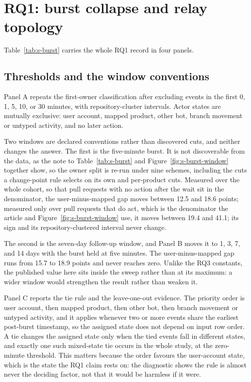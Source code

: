 \documentclass[pdflatex,sn-basic]{sn-jnl}
\begin{document}


\section{RQ1: burst collapse and relay topology}\label{app:rq1}

Table~\ref{tab:s-burst} carries the whole RQ1 record in four panels.

\subsection{Thresholds and the window conventions}\label{app:ordering}

Panel A repeats the first-owner classification after excluding events in the
first 0, 1, 5, 10, or 30 minutes, with repository-cluster intervals. Actor
states are mutually exclusive: user account, mapped product, other bot, branch
movement or untyped activity, and no later action.

Two windows are declared conventions rather than discovered cuts, and neither
changes the answer. The first is the five-minute burst. It is not discoverable
from the data, as the note to Table~\ref{tab:s-burst} and
Figure~\ref{fig:s-burst-window} together show, so the owner split is re-run
under nine schemes, including the cuts a change-point rule selects on its own
and per-product cuts. Measured over the whole cohort, so that pull requests with
no action after the wait sit in the denominator, the user-minus-mapped gap moves
between 12.5 and 18.6 points; measured only over pull requests that do act,
which is the denominator the article and Figure~\ref{fig:s-burst-window} use, it
moves between 19.4 and 41.1; its sign and its repository-clustered interval
never change.

The second is the seven-day follow-up window, and Panel B moves it to 1, 3, 7,
and 14 days with the burst held at five minutes. The user-minus-mapped gap runs
from 15.7 to 18.9 points and never reaches zero. Unlike the RQ3 constants, the
published value here sits inside the sweep rather than at its maximum: a wider window would
strengthen the result rather than weaken it.

Panel C reports the tie rule and the leave-one-out evidence. The priority order
is user account, then mapped product, then other bot, then branch movement or
untyped activity, and it applies whenever two or more events share the earliest
post-burst timestamp, so the assigned state does not depend on input row order.
A tie changes the assigned state only when the tied events fall in different
states, and exactly one such mixed-state tie occurs in the whole study, at the
zero-minute threshold. This matters because the order favours the user-account
state, which is the state the RQ1 claim rests on: the diagnostic shows the rule
is almost never the deciding factor, not that it would be harmless if it were.
\end{document}
